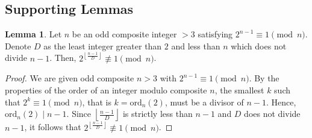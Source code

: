 \documentclass{article}
\theoremstyle{plain}
\theoremstyle{definition}
\newtheorem{lemma}{Lemma}
\begin{document}
\subsection{Supporting Lemmas}
\begin{lemma}
\label{lemma:1}
    Let $n$ be an odd composite integer $> 3$ satisfying $2^{n-1} \equiv 1 \pmod{n}$. Denote $D$ as the least integer greater than $2$ and less than $n$ which does not divide $n-1$. Then, $2^{\left\lfloor\frac{n-1}{D}\right\rfloor} \not\equiv 1 \pmod{n}$.
\end{lemma}
\begin{proof}
We are given odd composite $n > 3$ with $2^{n-1} \equiv 1 \pmod{n}$. By the properties of the order of an integer modulo composite $n$, the smallest $k$ such that $2^k \equiv 1 \pmod{n}$, that is $k = \text{ord}_n(2)$, must be a divisor of $n-1$. Hence, $\text{ord}_n(2) \mid n-1$. Since $\left\lfloor\frac{n-1}{D}\right\rfloor$ is strictly less than $n-1$ and $D$ does not divide $n-1$, it follows that $2^{\left\lfloor\frac{n-1}{D}\right\rfloor} \not\equiv 1 \pmod{n}$.
\end{proof}
\end{document}
